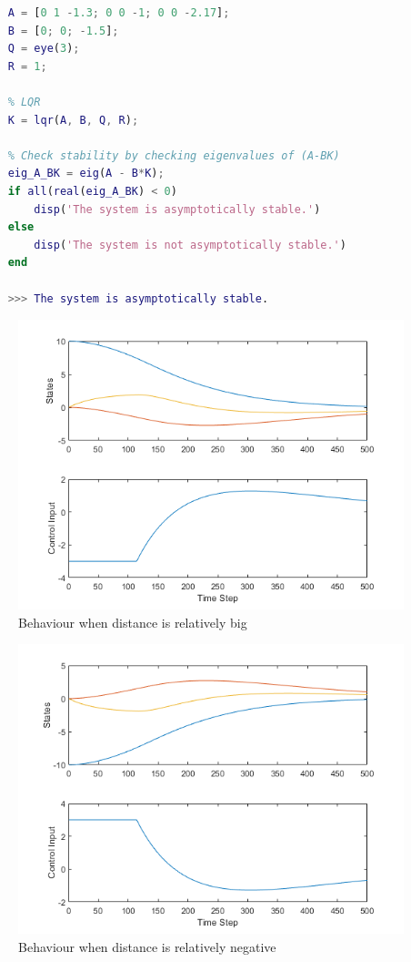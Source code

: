 \documentclass[12pt]{report}
\begin{document}
\begin{lstlisting}[language=Matlab]
    % Your system
    A = [0 1 -1.3; 0 0 -1; 0 0 -2.17];
    B = [0; 0; -1.5];
    Q = eye(3);  
    R = 1;  
    
    % LQR
    K = lqr(A, B, Q, R);
    
    % Check stability by checking eigenvalues of (A-BK)
    eig_A_BK = eig(A - B*K);
    if all(real(eig_A_BK) < 0)
        disp('The system is asymptotically stable.')
    else
        disp('The system is not asymptotically stable.')
    end

    >>> The system is asymptotically stable.
    \end{lstlisting}
\begin{figure}
    \centering
    \includegraphics[width = 0.8 \textwidth]{untitled.png}
    \caption{Behaviour when distance is relatively big}
\end{figure}

\begin{figure}
    \centering
    \includegraphics[width = 0.8 \textwidth]{geride.png}
    \caption{Behaviour when distance is relatively negative}
\end{figure}
\end{document}
